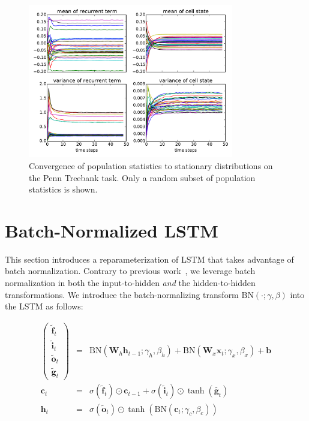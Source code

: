 \documentclass{article} %
\newcommand{\vect}[1]{\mathbf{#1}}
\newcommand{\mat}[1]{\mathbf{#1}}
\newcommand{\ewprod}{\odot}
\begin{document}
\begin{figure}[!ht]
\center
\includegraphics[width=0.8\textwidth]{figures/popstat_stationarity.pdf}
\caption{Convergence of population statistics to stationary distributions on the Penn Treebank task. Only a random subset of population statistics is shown.}
\label{fig:popstat_stationarity}
\end{figure}



\section{Batch-Normalized LSTM}
\label{sec:recurrent-batch-normalization}

This section introduces a reparameterization of LSTM that takes advantage of batch normalization.
Contrary to previous work~\cite{cesar, baidu}, we leverage batch normalization in both the input-to-hidden \emph{and} the hidden-to-hidden transformations.
We introduce the batch-normalizing transform $\mathrm{BN}(\cdot; \gamma, \beta)$ into the LSTM as follows:

\begin{eqnarray}
\left(\begin{array}{ccc}
\tilde{\vect{f}}_t \\
\tilde{\vect{i}}_t \\
\tilde{\vect{o}}_t \\
\tilde{\vect{g}}_t
\end{array}\right)
 &=&
 \mathrm{BN} (\mat{W}_h \vect{h}_{t-1}; \gamma_h, \beta_h) +
 \mathrm{BN} (\mat{W}_x \vect{x}_t   ; \gamma_x, \beta_x) +
 \vect{b}
\\
\vect{c}_t &=& \sigma(\tilde{\vect{f}}_t) \ewprod \vect{c}_{t-1} +
               \sigma(\tilde{\vect{i}}_t) \ewprod \tanh(\tilde{\vect{g}_t}) \\
\vect{h}_t &=& \sigma(\tilde{\vect{o}}_t) \ewprod \tanh(
 \mathrm{BN} (\vect{c}_t; \gamma_c, \beta_c)
)
\end{eqnarray}
\end{document}
